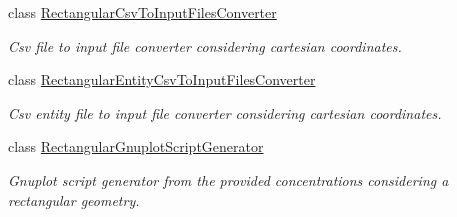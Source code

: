 \begin{DoxyCompactItemize}
class \hyperlink{classmultiscale_1_1video_1_1RectangularCsvToInputFilesConverter}{\-Rectangular\-Csv\-To\-Input\-Files\-Converter}
\begin{DoxyCompactList}\small\item\em \-Csv file to input file converter considering cartesian coordinates. \end{DoxyCompactList}\item 
class \hyperlink{classmultiscale_1_1video_1_1RectangularEntityCsvToInputFilesConverter}{\-Rectangular\-Entity\-Csv\-To\-Input\-Files\-Converter}
\begin{DoxyCompactList}\small\item\em \-Csv entity file to input file converter considering cartesian coordinates. \end{DoxyCompactList}\item 
class \hyperlink{classmultiscale_1_1video_1_1RectangularGnuplotScriptGenerator}{\-Rectangular\-Gnuplot\-Script\-Generator}
\begin{DoxyCompactList}\small\item\em \-Gnuplot script generator from the provided concentrations considering a rectangular geometry. \end{DoxyCompactList}\end{DoxyCompactItemize}
